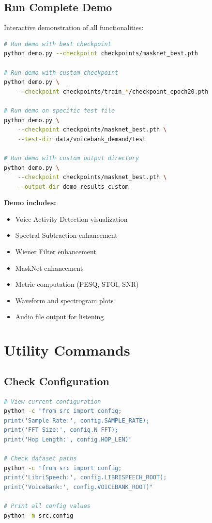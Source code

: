 \documentclass[12pt,a4paper]{article}
\begin{document}
\subsection{Run Complete Demo}

Interactive demonstration of all functionalities:

\begin{lstlisting}[language=bash]
# Run demo with best checkpoint
python demo.py --checkpoint checkpoints/masknet_best.pth

# Run demo with custom checkpoint
python demo.py \
    --checkpoint checkpoints/train_*/checkpoint_epoch20.pth

# Run demo on specific test file
python demo.py \
    --checkpoint checkpoints/masknet_best.pth \
    --test-dir data/voicebank_demand/test

# Run demo with custom output directory
python demo.py \
    --checkpoint checkpoints/masknet_best.pth \
    --output-dir demo_results_custom
\end{lstlisting}

\textbf{Demo includes:}
\begin{itemize}
    \item Voice Activity Detection visualization
    \item Spectral Subtraction enhancement
    \item Wiener Filter enhancement
    \item MaskNet enhancement
    \item Metric computation (PESQ, STOI, SNR)
    \item Waveform and spectrogram plots
    \item Audio file output for listening
\end{itemize}

\section{Utility Commands}

\subsection{Check Configuration}

\begin{lstlisting}[language=bash]
# View current configuration
python -c "from src import config; 
print('Sample Rate:', config.SAMPLE_RATE); 
print('FFT Size:', config.N_FFT); 
print('Hop Length:', config.HOP_LEN)"

# Check dataset paths
python -c "from src import config; 
print('LibriSpeech:', config.LIBRISPEECH_ROOT); 
print('VoiceBank:', config.VOICEBANK_ROOT)"

# Print all config values
python -m src.config
\end{lstlisting}
\end{document}
